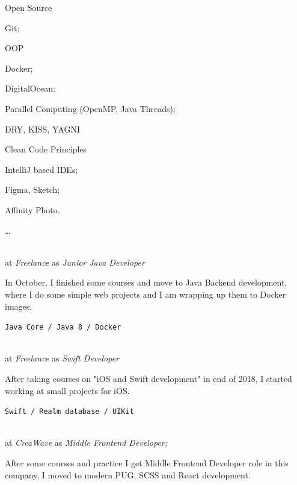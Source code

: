 \SmallSep

\begin{multicols}{3}
	\begin{compactitem}[\color{Cyan}$\circ$]
		\item Open Source \heart\
		\item Git;
		\item OOP
		\item Docker;
		\item DigitalOcean;
		\item Parallel Computing (OpenMP, Java Threads);
		\item DRY, KISS, YAGNI
		\item Clean Code Principles
		\item IntelliJ based IDEs;
		\item Figma, Sketch;
		\item Affinity Photo.
		\item \ldots
	\end{compactitem}
\end{multicols}

\Sep




 \\
at \textit{Freelance}
as \textit{Junior Java Developer}
\SmallSep

In October, I finished some courses and move to Java Backend development, where I do some simple web projects and I am wrapping up them to Docker images.
\SmallSep

\texttt{Java Core / Java 8 / Docker}
\SmallSep

 \\
at \textit{Freelance}
as \textit{Swift Developer}
\SmallSep

After taking courses on "iOS and Swift development" in end of 2018, I started working at small projects for iOS.
\SmallSep

\texttt{Swift / Realm database / UIKit}
\SmallSep

 \\
at \textit{CreaWave}
as \textit{Middle Frontend Developer;}
\SmallSep

After some courses and practice I get Middle Frontend Developer role in this company, I moved to modern PUG, SCSS and React development.
\SmallSep

